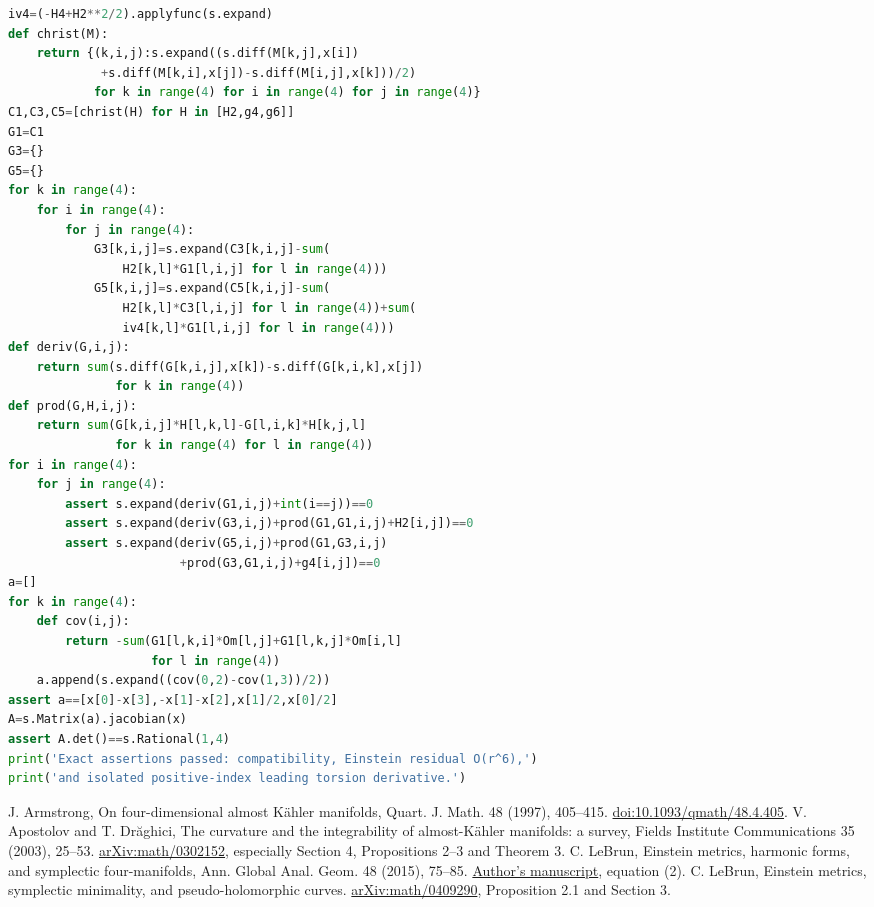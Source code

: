 \documentclass[11pt]{article}
\begin{document}
\begin{lstlisting}[language=Python]
iv4=(-H4+H2**2/2).applyfunc(s.expand)
def christ(M):
    return {(k,i,j):s.expand((s.diff(M[k,j],x[i])
             +s.diff(M[k,i],x[j])-s.diff(M[i,j],x[k]))/2)
            for k in range(4) for i in range(4) for j in range(4)}
C1,C3,C5=[christ(H) for H in [H2,g4,g6]]
G1=C1
G3={}
G5={}
for k in range(4):
    for i in range(4):
        for j in range(4):
            G3[k,i,j]=s.expand(C3[k,i,j]-sum(
                H2[k,l]*G1[l,i,j] for l in range(4)))
            G5[k,i,j]=s.expand(C5[k,i,j]-sum(
                H2[k,l]*C3[l,i,j] for l in range(4))+sum(
                iv4[k,l]*G1[l,i,j] for l in range(4)))
def deriv(G,i,j):
    return sum(s.diff(G[k,i,j],x[k])-s.diff(G[k,i,k],x[j])
               for k in range(4))
def prod(G,H,i,j):
    return sum(G[k,i,j]*H[l,k,l]-G[l,i,k]*H[k,j,l]
               for k in range(4) for l in range(4))
for i in range(4):
    for j in range(4):
        assert s.expand(deriv(G1,i,j)+int(i==j))==0
        assert s.expand(deriv(G3,i,j)+prod(G1,G1,i,j)+H2[i,j])==0
        assert s.expand(deriv(G5,i,j)+prod(G1,G3,i,j)
                        +prod(G3,G1,i,j)+g4[i,j])==0
a=[]
for k in range(4):
    def cov(i,j):
        return -sum(G1[l,k,i]*Om[l,j]+G1[l,k,j]*Om[i,l]
                    for l in range(4))
    a.append(s.expand((cov(0,2)-cov(1,3))/2))
assert a==[x[0]-x[3],-x[1]-x[2],x[1]/2,x[0]/2]
A=s.Matrix(a).jacobian(x)
assert A.det()==s.Rational(1,4)
print('Exact assertions passed: compatibility, Einstein residual O(r^6),')
print('and isolated positive-index leading torsion derivative.')

\end{lstlisting}
\begin{thebibliography}{9}
 J. Armstrong, On four-dimensional almost K\"ahler manifolds, Quart. J. Math. 48 (1997), 405--415. \href{https://doi.org/10.1093/qmath/48.4.405}{doi:10.1093/qmath/48.4.405}.
 V. Apostolov and T. Dr\u aghici, The curvature and the integrability of almost-K\"ahler manifolds: a survey, Fields Institute Communications 35 (2003), 25--53. \href{https://arxiv.org/abs/math/0302152}{arXiv:math/0302152}, especially Section 4, Propositions 2--3 and Theorem 3.
 C. LeBrun, Einstein metrics, harmonic forms, and symplectic four-manifolds, Ann. Global Anal. Geom. 48 (2015), 75--85. \href{https://www.math.stonybrook.edu/~claude/cake.pdf}{Author's manuscript}, equation (2).
 C. LeBrun, Einstein metrics, symplectic minimality, and pseudo-holomorphic curves. \href{https://arxiv.org/abs/math/0409290}{arXiv:math/0409290}, Proposition 2.1 and Section 3.
\end{thebibliography}
\end{document}
